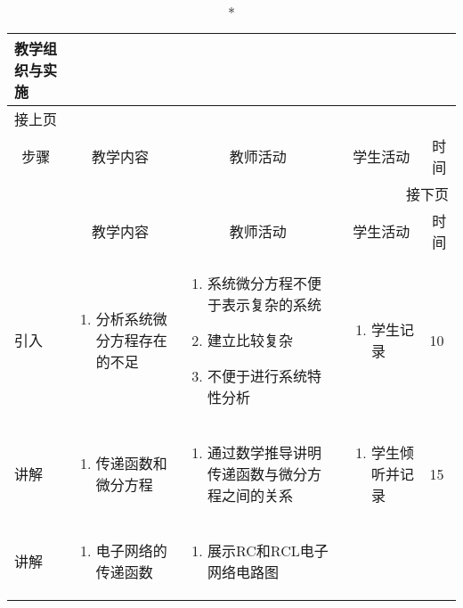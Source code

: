 {%
\begin{landscape}

\begin{longtable}{|m{10mm}|m{50mm}|m{50mm}|m{50mm}|m{15mm}|}
\caption*{\huge 教学组织与实施}\\
\hline
\endfirsthead
\multicolumn{5}{l}{\small 接上页}\\
\hline
\multicolumn{1}{|c|}{步骤}&\multicolumn{1}{c|}{教学内容}&\multicolumn{1}{c|}{教师活动}&\multicolumn{1}{c|}{学生活动}&\multicolumn{1}{c|}{时间}\\
\hline
\endhead

\multicolumn{5}{r}{\small 接下页}\\
\endfoot
\hline
\endlastfoot
\multicolumn{1}{|c|}{步骤}&\multicolumn{1}{c|}{教学内容}&\multicolumn{1}{c|}{教师活动}&\multicolumn{1}{c|}{学生活动}&\multicolumn{1}{c|}{时间}\\\hline
引入&\begin{enumerate}
\item 分析系统微分方程存在的不足
\end{enumerate} &\begin{enumerate}
\item 系统微分方程不便于表示复杂的系统
\item 建立比较复杂
\item 不便于进行系统特性分析
\end{enumerate} &\begin{enumerate}
\item 学生记录
\end{enumerate} &10 \\\hline
讲解&\begin{enumerate}
\item 传递函数和微分方程
\end{enumerate}
 &\begin{enumerate}
\item 通过数学推导讲明传递函数与微分方程之间的关系
\end{enumerate} &\begin{enumerate}
\item 学生倾听并记录
\end{enumerate} &15 \\\hline
讲解&\begin{enumerate}
\item 电子网络的传递函数
\end{enumerate}
&\begin{enumerate}
\item 展示RC和RCL电子网络电路图

\end{enumerate}
\end{longtable}
\end{landscape}}
